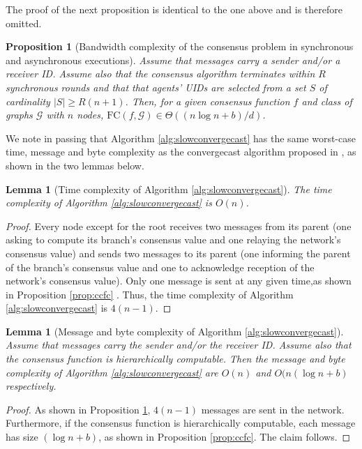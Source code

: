 \documentclass[letterpaper,10pt,conference]{ieeeconf}
\newtheorem{proposition}[theorem]{Proposition}
\newtheorem{lemma}[theorem]{Lemma}
\begin{document}
The proof of the next proposition is identical to the one above and is therefore omitted.

\begin{proposition}[Bandwidth complexity of the consensus problem in synchronous and asynchronous executions]
Assume that messages carry a sender and/or a receiver ID. Assume also that the consensus algorithm terminates within $R$ synchronous rounds and that  that agents' UIDs are selected from a set $S$ of cardinality $|S|\geq R (n+1)$.  Then, for a given consensus function $f$ and class of graphs $\mathcal G$ with $n$ nodes,  $\textrm{FC}(f, \mathcal G) \in \Theta((n\log n+b) /d)$.
\end{proposition}

We note in passing that Algorithm \ref{alg:slowconvergecast} has the same worst-case time, message and byte complexity as the convergecast algorithm proposed in \cite{FR-MP:13}, as shown in the two lemmas below.
\begin{lemma}[Time complexity of Algorithm \ref{alg:slowconvergecast}]
\label{prop:cctc}
The time complexity of Algorithm \ref{alg:slowconvergecast} is $O(n)$.
\end{lemma}
\begin{proof}
Every node except for the root receives two messages from its parent (one asking to compute its branch's consensus value and one relaying the network's consensus value) and sends two messages to its parent (one informing the parent of the branch's consensus value and one to acknowledge reception of the network's consensus value). Only one message is sent at any given time,as shown in Proposition \ref{prop:ccfc} . Thus, the time complexity of Algorithm \ref{alg:slowconvergecast} is $4(n-1)$. 
\end{proof}
\begin{lemma}[Message and byte complexity of Algorithm \ref{alg:slowconvergecast}]
Assume that messages carry the sender and/or the receiver ID. Assume also that the consensus function is hierarchically computable. Then the message and byte complexity of Algorithm \ref{alg:slowconvergecast} are $O(n)$ and $O(n(\log n + b)$ respectively. 
\end{lemma}
\begin{proof}
As shown in Proposition \ref{prop:cctc}, $4(n-1)$ messages are sent in the network. Furthermore, if the consensus function is hierarchically computable, each message has size $(\log n + b)$, as shown in Proposition \ref{prop:ccfc}. The claim follows.
\end{proof}
\end{document}
